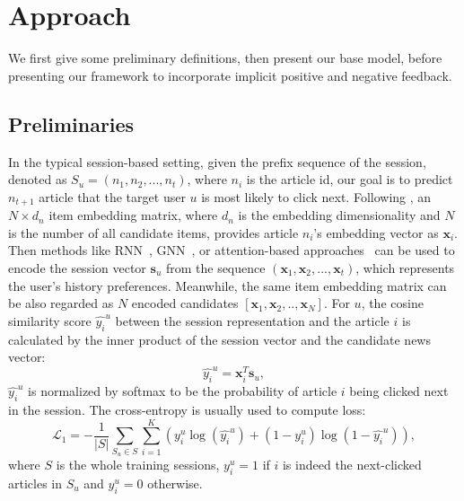 \section{Approach}
\label{sec:approach}
We first give some preliminary definitions, then present our base model, before
presenting our framework to incorporate implicit positive and negative feedback.

\label{sec:method}
\subsection{Preliminaries}
In the typical session-based setting, given the prefix sequence of the session, denoted as $S_u=(n_1, n_2,...,n_t)$, 
where $n_i$ is the article id, our goal is 
to predict $n_{t+1}$ article that the target user $u$ is most likely to click next. 
Following \citet{liu2018stamp}, an $N\times d_n$ 
item embedding matrix, where $d_n$ is the embedding dimensionality and $N$ is the number of
all candidate items, provides article $n_i$'s embedding vector 
as $\mathbf{x}_i$. Then methods like RNN~\cite{hidasi2018recurrent}, GNN~\cite{wu2019session, pan2020star}, 
or attention-based approaches~\cite{kang_self-attentive_2018, liu2018stamp} can be used to 
encode the session vector $\mathbf{s}_u$ from the sequence 
${(\mathbf{x}_1, \mathbf{x}_2, ..., \mathbf{x}_t)}$, which represents the user's history preferences.
Meanwhile, the same item embedding matrix can be also regarded as $N$ encoded candidates $[\mathbf{x}_1, \mathbf{x}_2,.., \mathbf{x}_N]$.
For $u$, the cosine similarity score $\hat{y_i}^u$ between the session representation and the article $i$ is calculated by the inner product of the session vector and the candidate news vector:
\begin{equation}
    \hat{y_i}^u = \mathbf{x}_i^T\mathbf{s}_u, 
\end{equation}
$\hat{y_i}^u$ is normalized by softmax to be the probability of article $i$ being clicked next in the session. 
The cross-entropy is usually used to compute loss:
\begin{equation}
    \mathcal{L}_1 = - \frac{1}{|S|}\sum_{S_u \in S}\sum_{i=1}^K ( y_i^u \log(\hat{y_i}^u) + (1-y_i^u)\log(1-\hat{y_i}^u)),
\end{equation}
where $S$ is the whole training sessions, $y_i^u=1$ if $i$ is indeed the next-clicked articles in $S_u$ and $y_i^u=0$ otherwise.

